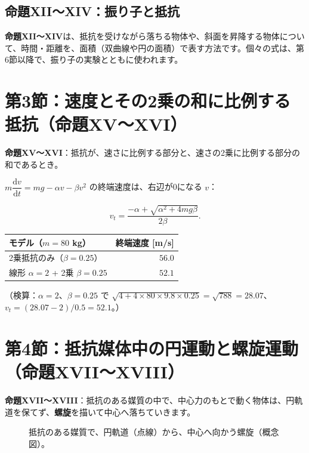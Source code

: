 \documentclass[a4paper,11pt,openany]{ltjsbook}
\newcommand{\dd}{\mathrm{d}}
\begin{document}
\subsection{命題XII〜XIV：振り子と抵抗}

\textbf{命題XII〜XIV}は、抵抗を受けながら落ちる物体や、斜面を昇降する物体について、時間・距離を、面積（双曲線や円の面積）で表す方法です。個々の式は、第6節以降で、振り子の実験とともに使われます。

\section{第3節：速度とその2乗の和に比例する抵抗（命題XV〜XVI）}

\textbf{命題XV〜XVI}：抵抗が、速さに比例する部分と、速さの2乗に比例する部分の和であるとき。

$m\dfrac{\dd v}{\dd t}=mg-\alpha v-\beta v^2$ の終端速度は、右辺が0になる $v$：

\[
v_t=\frac{-\alpha+\sqrt{\alpha^2+4mg\beta}}{2\beta}.
\]

\begin{center}
\begin{tabular}{lr}
\toprule
モデル（$m=80$ kg） & 終端速度 [m/s]\\
\midrule
2乗抵抗のみ（$\beta=0.25$） & $56.0$\\
線形 $\alpha=2$ + 2乗 $\beta=0.25$ & $52.1$\\
\bottomrule
\end{tabular}
\end{center}

（検算：$\alpha=2$、$\beta=0.25$ で $\sqrt{4+4\times80\times9.8\times0.25}=\sqrt{788}=28.07$、$v_t=(28.07-2)/0.5=52.1$。）

\section{第4節：抵抗媒体中の円運動と螺旋運動（命題XVII〜XVIII）}

\textbf{命題XVII〜XVIII}：抵抗のある媒質の中で、中心力のもとで動く物体は、円軌道を保てず、\textbf{螺旋}を描いて中心へ落ちていきます。

\begin{figure}[htbp]
\centering
{}
\caption{抵抗のある媒質で、円軌道（点線）から、中心へ向かう螺旋（概念図）。}
\end{figure}
\end{document}
